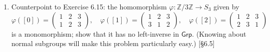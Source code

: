 \begin{enumerate}
    \item Counterpoint to Exercise 6.15: the homomorphism $\varphi: \mathbb{Z}/3\mathbb{Z} \to S_3$ given by
          \[ \varphi([0]) = \begin{pmatrix} 1 & 2 & 3 \\ 1 & 2 & 3 \end{pmatrix}, \quad \varphi([1]) = \begin{pmatrix} 1 & 2 & 3 \\ 3 & 1 & 2 \end{pmatrix}, \quad \varphi([2]) = \begin{pmatrix} 1 & 2 & 3 \\ 2 & 3 & 1 \end{pmatrix} \]
          is a monomorphism; show that it has no left-inverse in $\mathsf{Grp}$. (Knowing about normal subgroups will make this problem particularly easy.) [\S6.5]
\end{enumerate}
